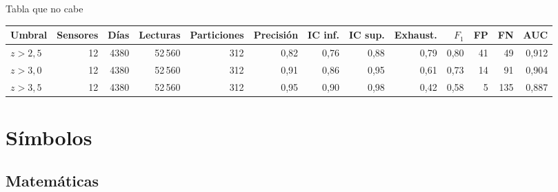 \documentclass[aspectratio=169,9pt]{beamer}
\begin{document}
\begin{frame}{Tabla que no cabe}
\begin{tworows}

  \begin{tabular}{@{}lrrrrrrrrrrrr@{}}
    \toprule
    Umbral & Sensores & Días & Lecturas & Particiones & Precisión & IC inf. & IC sup. & Exhaust. & $F_1$ & FP & FN & AUC \\
    \midrule
    $z > 2{,}5$ & 12 & 4380 & 52\,560 & 312 & 0,82 & 0,76 & 0,88 & 0,79 & 0,80 & 41 & 49 & 0,912 \\
    $z > 3{,}0$ & 12 & 4380 & 52\,560 & 312 & 0,91 & 0,86 & 0,95 & 0,61 & 0,73 & 14 & 91 & 0,904 \\
    $z > 3{,}5$ & 12 & 4380 & 52\,560 & 312 & 0,95 & 0,90 & 0,98 & 0,42 & 0,58 &  5 & 135 & 0,887 \\
    \bottomrule
  \end{tabular}
\nextrow

\end{tworows}
\end{frame}

\section{Símbolos}

\subsection{Matemáticas}
\end{document}
